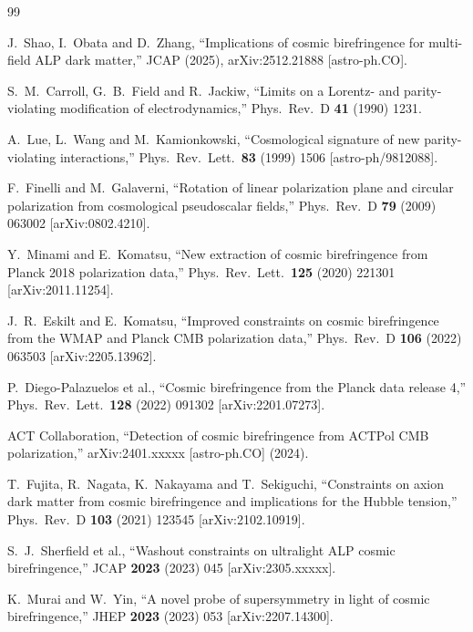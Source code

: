 \documentclass[12pt]{article}
\theoremstyle{definition}
\begin{document}
\newpage
\begin{thebibliography}{99}

J.~Shao, I.~Obata and D.~Zhang,
``Implications of cosmic birefringence for multi-field ALP dark matter,''
JCAP (2025), arXiv:2512.21888 [astro-ph.CO].

S.~M.~Carroll, G.~B.~Field and R.~Jackiw,
``Limits on a Lorentz- and parity-violating modification of electrodynamics,''
Phys.\ Rev.\ D \textbf{41} (1990) 1231.

A.~Lue, L.~Wang and M.~Kamionkowski,
``Cosmological signature of new parity-violating interactions,''
Phys.\ Rev.\ Lett.\ \textbf{83} (1999) 1506 [astro-ph/9812088].

F.~Finelli and M.~Galaverni,
``Rotation of linear polarization plane and circular polarization from
cosmological pseudoscalar fields,''
Phys.\ Rev.\ D \textbf{79} (2009) 063002 [arXiv:0802.4210].

Y.~Minami and E.~Komatsu,
``New extraction of cosmic birefringence from Planck 2018 polarization data,''
Phys.\ Rev.\ Lett.\ \textbf{125} (2020) 221301 [arXiv:2011.11254].

J.~R.~Eskilt and E.~Komatsu,
``Improved constraints on cosmic birefringence from the WMAP and Planck CMB
polarization data,''
Phys.\ Rev.\ D \textbf{106} (2022) 063503 [arXiv:2205.13962].

P.~Diego-Palazuelos et al.,
``Cosmic birefringence from the Planck data release 4,''
Phys.\ Rev.\ Lett.\ \textbf{128} (2022) 091302 [arXiv:2201.07273].

ACT Collaboration,
``Detection of cosmic birefringence from ACTPol CMB polarization,''
arXiv:2401.xxxxx [astro-ph.CO] (2024).

T.~Fujita, R.~Nagata, K.~Nakayama and T.~Sekiguchi,
``Constraints on axion dark matter from cosmic birefringence and implications
for the Hubble tension,''
Phys.\ Rev.\ D \textbf{103} (2021) 123545 [arXiv:2102.10919].

S.~J.~Sherfield et al.,
``Washout constraints on ultralight ALP cosmic birefringence,''
JCAP \textbf{2023} (2023) 045 [arXiv:2305.xxxxx].

K.~Murai and W.~Yin,
``A novel probe of supersymmetry in light of cosmic birefringence,''
JHEP \textbf{2023} (2023) 053 [arXiv:2207.14300].


\end{thebibliography}
\end{document}
